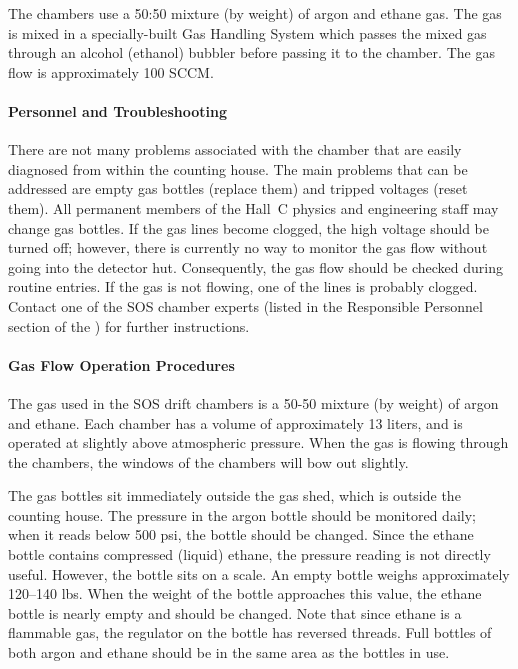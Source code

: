 The chambers use a 50:50 mixture (by weight) of
argon and ethane gas.  The gas is mixed in a specially-built Gas
Handling System which passes the mixed gas through an alcohol (ethanol) bubbler before
passing it to the chamber.
The gas flow is approximately 100 SCCM.

\paragraph{Personnel and Troubleshooting}

There are not many problems associated with the chamber that are
easily diagnosed from within the counting house.  The main problems
that can be addressed are empty gas bottles (replace them) and tripped
voltages (reset them). All permanent members
of the Hall~C physics and engineering staff may change gas bottles.
If the gas lines become clogged, the high
voltage should be turned off; however, there is currently no way to
monitor the gas flow without going into the detector hut.
Consequently, the gas flow should be checked during routine entries.
If the gas is not flowing, one of the lines is probably clogged.
Contact one of the SOS chamber experts (listed in the Responsible Personnel
section of the 
)
 for further instructions.

\paragraph{Gas Flow Operation Procedures}

The gas used in the SOS drift chambers is a 50-50 mixture (by weight)
of argon and ethane.  Each chamber has a volume of approximately 13
liters, and is operated at slightly above atmospheric pressure.  When
the gas is flowing through the chambers, the windows of the chambers
will bow out slightly.

The gas bottles sit immediately outside the gas shed, which is outside
the counting house.  The pressure in the argon bottle should be
monitored daily; when it reads below 500 psi, the bottle should be
changed.  Since the ethane bottle contains compressed (liquid) ethane,
the pressure reading is not directly useful.  However, the bottle sits
on a scale.  An empty bottle weighs approximately 120--140 lbs.  When
the weight of the bottle approaches this value, the ethane bottle is
nearly empty and should be changed.  Note that since ethane is a
flammable gas, the regulator on the bottle has reversed threads.  Full
bottles of both argon and ethane should be in the same area as the
bottles in use.  

